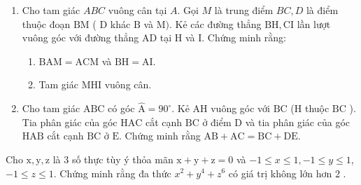 \begin{bt}
    \hfil
    \begin{enumerate}[1.]
        \item Cho tam giác $A B C$ vuông cân tại $A$. Gọi $M$ là trung điểm $B C, D$ là điểm thuộc đoạn $\mathrm{BM}$ ( $\mathrm{D}$ khác $\mathrm{B}$ và $\mathrm{M})$. Kẻ các đường thẳng $\mathrm{BH}, \mathrm{CI}$ lần lượt vuông góc với đường thẳng $\mathrm{AD}$ tại $\mathrm{H}$ và $\mathrm{I}$. Chứng minh rằng:
        \begin{enumerate}
            \item $\mathrm{BAM}=\mathrm{ACM}$ và $\mathrm{BH}=\mathrm{AI}$.
            \item Tam giác MHI vuông cân.
        \end{enumerate}   
        \item Cho tam giác $\mathrm{ABC}$ có góc $\hat{\mathrm{A}}=90^{\circ}$. Kẻ $\mathrm{AH}$ vuông góc với $\mathrm{BC}$ (H thuộc $\mathrm{BC}$ ). Tia phân giác của góc $\mathrm{HAC}$ cắt cạnh $\mathrm{BC}$ ở điểm $\mathrm{D}$ và tia phân giác của góc $\mathrm{HAB}$ cắt cạnh $\mathrm{BC}$ ở $\mathrm{E}$. Chứng minh rằng $\mathrm{AB}+\mathrm{AC}=\mathrm{BC}+\mathrm{DE}$.
    \end{enumerate}
\loigiai{}
\end{bt}

\begin{bt}
    Cho $\mathrm{x}, \mathrm{y}, \mathrm{z}$ là 3 số thực tùy ý thỏa mãn $\mathrm{x}+\mathrm{y}+\mathrm{z}=0$ và $-1 \leq x \leq 1,-1 \leq y \leq 1$, $-1 \leq z \leq 1$. Chứng minh rằng đa thức $x^2+y^4+z^6$ có giá trị không lớn hơn 2 .
\loigiai{}
\end{bt}

